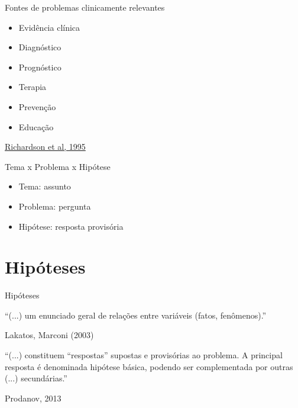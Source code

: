 \documentclass{beamer}
\begin{document}
\begin{frame}{Fontes de problemas clinicamente relevantes}
  \begin{itemize}
    \footnotesize
  \item Evidência clínica
    \medskip
  \item Diagnóstico
    \medskip
  \item Prognóstico
    \medskip
  \item Terapia
    \medskip
  \item Prevenção
    \medskip
  \item Educação
  \end{itemize}

  \vfill
  \scriptsize
  \hfill \href{https://acpjc.acponline.org/Content/123/3/issue/ACPJC-1995-123-3-A12.htm}
      {Richardson et al, 1995}
\end{frame}

\begin{frame}{Tema x Problema x Hipótese}
  \begin{itemize}
    \footnotesize
  \item Tema: assunto
    \bigskip
  \item Problema: pergunta
    \bigskip
  \item Hipótese: resposta provisória
  \end{itemize}
\end{frame}

\section{Hipóteses}


\begin{frame}{Hipóteses}
  \begin{block}{}
    ``(...) um enunciado geral de \alert{relações entre variáveis}
    (fatos, fenômenos).''

    \vfill
    \scriptsize
    \hfill Lakatos, Marconi (2003)
  \end{block}
  \begin{block}{}
    ``(...) constituem ``respostas'' supostas e provisórias ao
    problema. A principal resposta é denominada hipótese básica,
    podendo ser complementada por outras (...) secundárias.''

    \vfill
    \scriptsize
    \hfill Prodanov, 2013
  \end{block}
\end{frame}
\end{document}
